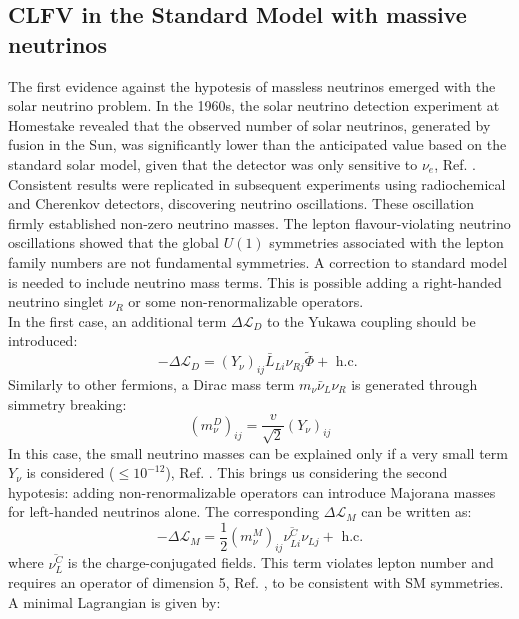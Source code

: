 \subsection{CLFV in the Standard Model with massive neutrinos}\label{massiveneutrinos}
The first evidence against the hypotesis of massless neutrinos emerged with the solar neutrino problem. In the 1960s, the solar neutrino detection experiment at Homestake revealed that the observed number of solar neutrinos, generated by fusion in the Sun, was significantly lower than the anticipated value based on the standard solar model, given that the detector was only sensitive to $\nu_e$, Ref. \cite{PhysRevLett.20.1205}. Consistent results were replicated in subsequent experiments using radiochemical and Cherenkov detectors, discovering neutrino oscillations. These oscillation firmly established non-zero neutrino masses. The lepton flavour-violating neutrino oscillations showed that the global $U(1)$ symmetries associated with the lepton family numbers are not fundamental symmetries. A correction to standard model is needed to include neutrino mass terms. This is possible adding a right-handed neutrino singlet $\nu_R$ or some non-renormalizable operators.
\\
In the first case, an additional term $\Delta \mathscr{L}_D$ to the Yukawa coupling should be introduced:
\begin{equation}
-\Delta \mathscr{L}_D=\left(Y_\nu\right)_{i j} \bar{L}_{L i} \nu_{Rj} \widetilde{\Phi}+\text { h.c. }
\end{equation}
Similarly to other fermions, a Dirac mass term $m_{\nu} \bar{\nu}_L \nu_R$ is generated through simmetry breaking:
\begin{equation}
\left(m_\nu^D\right)_{i j}=\frac{v}{\sqrt{2}}\left(Y_\nu\right)_{i j}
\end{equation}
In this case, the small neutrino masses can be explained only if a very small term $Y_\nu$ is considered ($\leq 10^{-12}$), Ref. \cite{clfv_signorelli}. This brings us considering the second hypotesis: adding non-renormalizable operators can introduce Majorana masses for left-handed neutrinos alone. The corresponding $\Delta \mathscr{L}_M$ can be written as:
\begin{equation}
-\Delta \mathscr{L}_M=\frac{1}{2}\left(m_\nu^M\right)_{i j} \overline{\nu_{L i}^C} \nu_{L j}+\text{ h.c.}
\end{equation}
where $\overline{\nu_{L }^C} $ is the charge-conjugated fields. This term violates lepton number and requires an operator of dimension 5, Ref. \cite{wein}, to be consistent with SM symmetries. A minimal Lagrangian is given by:
